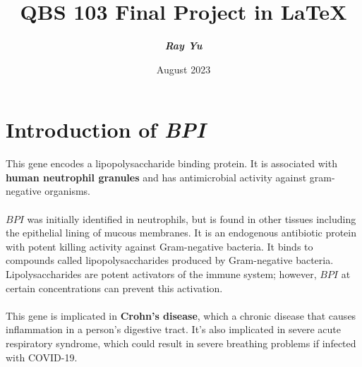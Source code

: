 \documentclass{article}
\title{{\textbf{QBS 103 Final Project in \LaTeX}}}
\author{{\textbf{{\textit{Ray Yu}}}}}
\date{August 2023}
\begin{document}
\maketitle

\tableofcontents

\newpage

\section{Introduction of {\textit{BPI}}}
This gene encodes a lipopolysaccharide binding protein. It is associated with {\textbf{human neutrophil granules}} and has antimicrobial activity against gram-negative organisms.\\\\
{\textbf{$BPI$}} was initially identified in neutrophils, but is found in other tissues including the epithelial lining of mucous membranes. It is an endogenous antibiotic protein with potent killing activity against Gram-negative bacteria. It binds to compounds called lipopolysaccharides produced by Gram-negative bacteria. Lipolysaccharides are potent activators of the immune system; however, {\textbf{$BPI$}} at certain concentrations can prevent this activation.\cite{bpigene2}\\\\
This gene is implicated in {\textbf{Crohn's disease}}, which a chronic disease that causes inflammation in a person's digestive tract. It's also implicated in severe acute respiratory syndrome, which could result in severe breathing problems if infected with COVID-19.\cite{bpigene}
\end{document}
